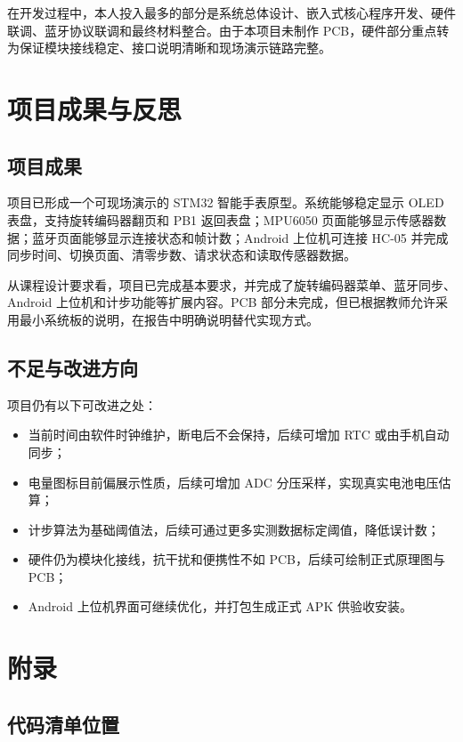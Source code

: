 \documentclass[UTF8,fontset=windows,12pt,a4paper]{ctexart}
\begin{document}
在开发过程中，本人投入最多的部分是系统总体设计、嵌入式核心程序开发、硬件联调、蓝牙协议联调和最终材料整合。由于本项目未制作 PCB，硬件部分重点转为保证模块接线稳定、接口说明清晰和现场演示链路完整。

\section{项目成果与反思}

\subsection{项目成果}

项目已形成一个可现场演示的 STM32 智能手表原型。系统能够稳定显示 OLED 表盘，支持旋转编码器翻页和 PB1 返回表盘；MPU6050 页面能够显示传感器数据；蓝牙页面能够显示连接状态和帧计数；Android 上位机可连接 HC-05 并完成同步时间、切换页面、清零步数、请求状态和读取传感器数据。

从课程设计要求看，项目已完成基本要求，并完成了旋转编码器菜单、蓝牙同步、Android 上位机和计步功能等扩展内容。PCB 部分未完成，但已根据教师允许采用最小系统板的说明，在报告中明确说明替代实现方式。

\subsection{不足与改进方向}

项目仍有以下可改进之处：
\begin{itemize}[leftmargin=2em]
  \item 当前时间由软件时钟维护，断电后不会保持，后续可增加 RTC 或由手机自动同步；
  \item 电量图标目前偏展示性质，后续可增加 ADC 分压采样，实现真实电池电压估算；
  \item 计步算法为基础阈值法，后续可通过更多实测数据标定阈值，降低误计数；
  \item 硬件仍为模块化接线，抗干扰和便携性不如 PCB，后续可绘制正式原理图与 PCB；
  \item Android 上位机界面可继续优化，并打包生成正式 APK 供验收安装。
\end{itemize}

\section{附录}

\subsection{代码清单位置}
\end{document}
